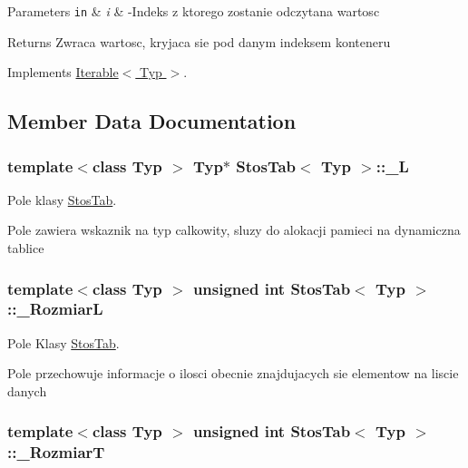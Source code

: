 \begin{DoxyParams}[1]{Parameters}
\mbox{\tt in}  & {\em i} & -\/\-Indeks z ktorego zostanie odczytana wartosc\\
\hline
\end{DoxyParams}
\begin{DoxyReturn}{Returns}
Zwraca wartosc, kryjaca sie pod danym indeksem konteneru 
\end{DoxyReturn}


Implements \hyperlink{class_iterable_a6b75a7c8c41e1f13e6eff2276af62aeb}{Iterable$<$ Typ $>$}.



\subsection{Member Data Documentation}
\hypertarget{class_stos_tab_ab6a9150fc50f2eb508a6c8026816631b}{
\subsubsection[{\-\_\-\-L}]{\setlength{\rightskip}{0pt plus 5cm}template$<$class Typ $>$ Typ$\ast$ {\bf Stos\-Tab}$<$ Typ $>$\-::\-\_\-\-L\hspace{0.3cm}{\ttfamily [private]}}}\label{class_stos_tab_ab6a9150fc50f2eb508a6c8026816631b}


Pole klasy \hyperlink{class_stos_tab}{Stos\-Tab}. 

Pole zawiera wskaznik na typ calkowity, sluzy do alokacji pamieci na dynamiczna tablice \hypertarget{class_stos_tab_abb7d52d46fdaf90dc2f3acb421bf7af6}{
\subsubsection[{\-\_\-\-Rozmiar\-L}]{\setlength{\rightskip}{0pt plus 5cm}template$<$class Typ $>$ unsigned int {\bf Stos\-Tab}$<$ Typ $>$\-::\-\_\-\-Rozmiar\-L\hspace{0.3cm}{\ttfamily [private]}}}\label{class_stos_tab_abb7d52d46fdaf90dc2f3acb421bf7af6}


Pole Klasy \hyperlink{class_stos_tab}{Stos\-Tab}. 

Pole przechowuje informacje o ilosci obecnie znajdujacych sie elementow na liscie danych \hypertarget{class_stos_tab_a4db33c7f5b5f57b4d755a1beb59852dc}{
\subsubsection[{\-\_\-\-Rozmiar\-T}]{\setlength{\rightskip}{0pt plus 5cm}template$<$class Typ $>$ unsigned int {\bf Stos\-Tab}$<$ Typ $>$\-::\-\_\-\-Rozmiar\-T\hspace{0.3cm}{\ttfamily [private]}}}\label{class_stos_tab_a4db33c7f5b5f57b4d755a1beb59852dc}


